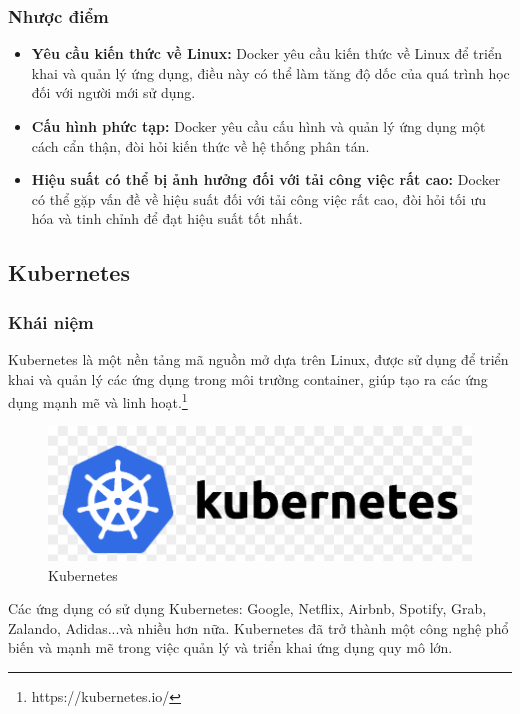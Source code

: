 \subsubsection{Nhược điểm}
\begin{itemize}
  \item \textbf{Yêu cầu kiến thức về Linux:} Docker yêu cầu kiến thức về Linux để triển khai và quản lý ứng dụng, điều này có thể làm tăng độ dốc của quá trình học đối với người mới sử dụng.
  \item \textbf{Cấu hình phức tạp:} Docker yêu cầu cấu hình và quản lý ứng dụng một cách cẩn thận, đòi hỏi kiến thức về hệ thống phân tán.
  \item \textbf{Hiệu suất có thể bị ảnh hưởng đối với tải công việc rất cao:} Docker có thể gặp vấn đề về hiệu suất đối với tải công việc rất cao, đòi hỏi tối ưu hóa và tinh chỉnh để đạt hiệu suất tốt nhất.
\end{itemize}
\subsection{Kubernetes}
\subsubsection{Khái niệm}
\noindent Kubernetes là một nền tảng mã nguồn mở dựa trên Linux, được sử dụng để triển khai và quản lý các ứng dụng trong môi trường container, giúp tạo ra các ứng dụng mạnh mẽ và linh hoạt.\footnote{https://kubernetes.io/}
\begin{figure}[H]
  \begin{center}
    \includegraphics[scale=0.3]{images/hieu/phuluc/kubernetes.png}
    \caption{Kubernetes}
  \end{center}
\end{figure}
\noindent Các ứng dụng có sử dụng Kubernetes: Google, Netflix, Airbnb, Spotify, Grab, Zalando, Adidas...và nhiều hơn nữa. Kubernetes đã trở thành một công nghệ phổ biến và mạnh mẽ trong việc quản lý và triển khai ứng dụng quy mô lớn.
